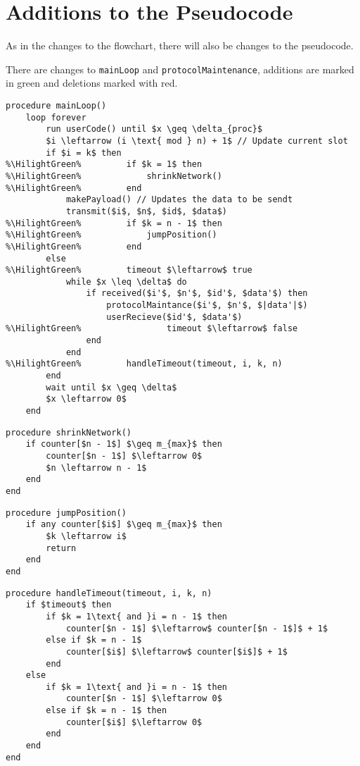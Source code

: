 \section{Additions to the Pseudocode}
As in the changes to the flowchart, there will also be changes to the pseudocode. 

There are changes to \texttt{mainLoop} and \texttt{protocolMaintenance}, additions are marked in green and deletions marked with red.

\begin{lstlisting}[style=pseudocode,mathescape=true,float, label={lst:general_case2}, caption={Modifications to the previous pseudocode are highlighted in green.}, escapechar=\%] 
procedure mainLoop()
	loop forever
		run userCode() until $x \geq \delta_{proc}$
		$i \leftarrow (i \text{ mod } n) + 1$ // Update current slot
		if $i = k$ then
%\HilightGreen%			if $k = 1$ then
%\HilightGreen%				shrinkNetwork()
%\HilightGreen%			end
			makePayload() // Updates the data to be sendt
			transmit($i$, $n$, $id$, $data$)
%\HilightGreen%			if $k = n - 1$ then
%\HilightGreen%				jumpPosition()
%\HilightGreen%			end
		else
%\HilightGreen%			timeout $\leftarrow$ true
			while $x \leq \delta$ do
				if received($i'$, $n'$, $id'$, $data'$) then
					protocolMaintance($i'$, $n'$, $|data'|$)
					userRecieve($id'$, $data'$)
%\HilightGreen%					timeout $\leftarrow$ false
				end
			end
%\HilightGreen%			handleTimeout(timeout, i, k, n)
		end
		wait until $x \geq \delta$
		$x \leftarrow 0$ 
	end
\end{lstlisting} 

\begin{lstlisting}[style=pseudocode,mathescape=true,float, label={lst:general_case5}, caption={Pseudocode example of the main loop}] 
procedure shrinkNetwork()
	if counter[$n - 1$] $\geq m_{max}$ then
		counter[$n - 1$] $\leftarrow 0$
		$n \leftarrow n - 1$
	end
end
\end{lstlisting}

\begin{lstlisting}[style=pseudocode,mathescape=true,float, label={lst:general_case4}, caption={If any counter is over its limit, then move to its position in the next frame and reduce the size of the network}] 
procedure jumpPosition()
	if any counter[$i$] $\geq m_{max}$ then
		$k \leftarrow i$
		return
	end
end
\end{lstlisting}

\begin{lstlisting}[style=pseudocode,mathescape=true,float, label={lst:general_case3}, caption={This code handles counting how many times a given device has timed out. }]
procedure handleTimeout(timeout, i, k, n) 
	if $timeout$ then
		if $k = 1\text{ and }i = n - 1$ then
			counter[$n - 1$] $\leftarrow$ counter[$n - 1$]$ + 1$
		else if $k = n - 1$
			counter[$i$] $\leftarrow$ counter[$i$]$ + 1$
		end
	else 
		if $k = 1\text{ and }i = n - 1$ then
			counter[$n - 1$] $\leftarrow 0$
		else if $k = n - 1$ then
			counter[$i$] $\leftarrow 0$
		end
	end
end
\end{lstlisting}

